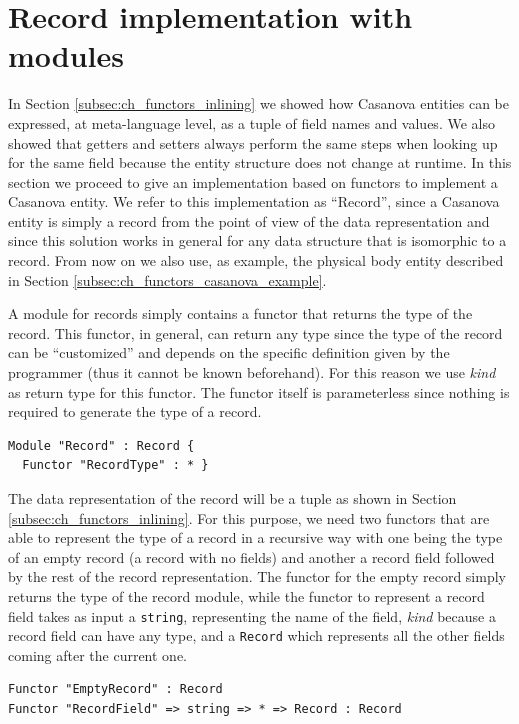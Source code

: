 \section{Record implementation with modules}
\label{sec:ch_functors_record_implementation}
In Section \ref{subsec:ch_functors_inlining} we showed how Casanova entities can be expressed, at meta-language level, as a tuple of field names and values. We also showed that getters and setters always perform the same steps when looking up for the same field because the entity structure does not change at runtime. In this section we proceed to give an implementation based on functors to implement a Casanova entity. We refer to this implementation as ``Record'', since a Casanova entity is simply a record from the point of view of the data representation and since this solution works in general for any data structure that is isomorphic to a record. From now on we also use, as example, the physical body entity described in Section \ref{subsec:ch_functors_casanova_example}.

A module for records simply contains a functor that returns the type of the record. This functor, in general, can return any type since the type of the record can be ``customized'' and depends on the specific definition given by the programmer (thus it cannot be known beforehand). For this reason we use \textit{kind} as return type for this functor. The functor itself is parameterless since nothing is required to generate the type of a record.

\begin{lstlisting}
Module "Record" : Record {
  Functor "RecordType" : * }
\end{lstlisting}

The data representation of the record will be a tuple as shown in Section \ref{subsec:ch_functors_inlining}. For this purpose, we need two functors that are able to represent the type of a record in a recursive way with one being the type of an empty record (a record with no fields) and another a record field followed by the rest of the record representation. The functor for the empty record simply returns the type of the record module, while the functor to represent a record field takes as input a \texttt{string}, representing the name of the field, \textit{kind} because a record field can have any type, and a \texttt{Record} which represents all the other fields coming after the current one. 

\begin{lstlisting}
Functor "EmptyRecord" : Record
Functor "RecordField" => string => * => Record : Record
\end{lstlisting}

